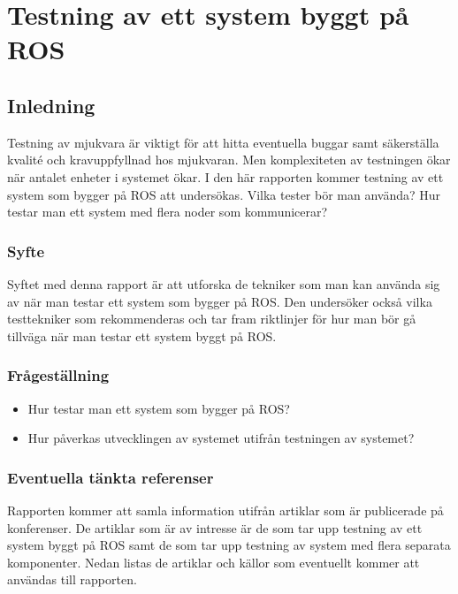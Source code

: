 \chapter{Testning av ett system byggt på ROS}
\label{cha:indiv-report-person}

\section{Inledning}
\label{sec:introduction-person}

Testning av mjukvara är viktigt för att hitta eventuella buggar samt säkerställa kvalité och kravuppfyllnad hos mjukvaran. Men komplexiteten av testningen ökar när antalet enheter i systemet ökar. I den här rapporten kommer testning av ett system som bygger på ROS att undersökas. Vilka tester bör man använda? Hur testar man ett system med flera noder som kommunicerar?

\subsection{Syfte}
\label{sec:purpose-person}

Syftet med denna rapport är att utforska de tekniker som man kan använda sig av när man testar ett system som bygger på ROS. Den undersöker också vilka testtekniker som rekommenderas och tar fram riktlinjer för hur man bör gå tillväga när man testar ett system byggt på ROS.

\subsection{Frågeställning}
\label{sec:issue-person}

\begin{itemize}
	\item Hur testar man ett system som bygger på ROS?
	\item Hur påverkas utvecklingen av systemet utifrån testningen av systemet?
\end{itemize}

\subsection{Eventuella tänkta referenser}

Rapporten kommer att samla information utifrån artiklar som är publicerade på konferenser. De artiklar som är av intresse är de som tar upp testning av ett system byggt på ROS samt de som tar upp testning av system med flera separata komponenter. Nedan listas de artiklar och källor som eventuellt kommer att användas till rapporten.

